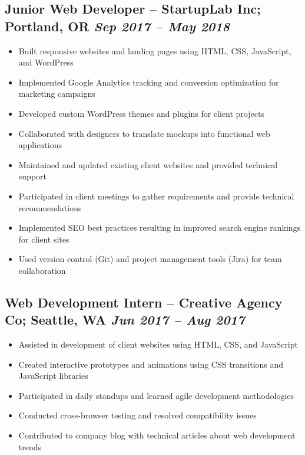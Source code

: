 \documentclass[a4paper,10pt]{article}           %
\begin{document}
    \subsection*{Junior Web Developer – StartupLab Inc; Portland, OR \hfill \textit{Sep 2017 – May 2018}}
    \vspace{-0.5em}
    \begin{itemize}[leftmargin=0.2cm, itemsep=0pt, label=--]
        \item Built responsive websites and landing pages using HTML, CSS, JavaScript, and WordPress
        \item Implemented Google Analytics tracking and conversion optimization for marketing campaigns
        \item Developed custom WordPress themes and plugins for client projects
        \item Collaborated with designers to translate mockups into functional web applications
        \item Maintained and updated existing client websites and provided technical support
        \item Participated in client meetings to gather requirements and provide technical recommendations
        \item Implemented SEO best practices resulting in improved search engine rankings for client sites
        \item Used version control (Git) and project management tools (Jira) for team collaboration
    \end{itemize}

    \subsection*{Web Development Intern – Creative Agency Co; Seattle, WA \hfill \textit{Jun 2017 – Aug 2017}}
    \vspace{-0.5em}
    \begin{itemize}[leftmargin=0.2cm, itemsep=0pt, label=--]
        \item Assisted in development of client websites using HTML, CSS, and JavaScript
        \item Created interactive prototypes and animations using CSS transitions and JavaScript libraries
        \item Participated in daily standups and learned agile development methodologies
        \item Conducted cross-browser testing and resolved compatibility issues
        \item Contributed to company blog with technical articles about web development trends
    \end{itemize}
\end{document}
